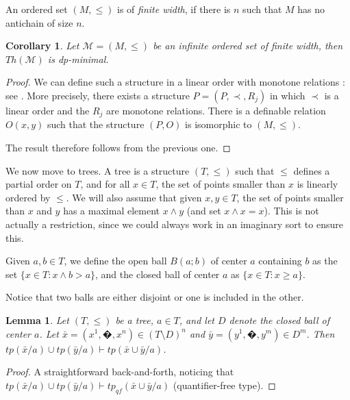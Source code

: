 \documentclass[english]{article}
\newtheorem{cor}[thm]{Corollary}
\newtheorem{lemme}[thm]{Lemma}
\theoremstyle{definition}
\theoremstyle{mystyle}
\theoremstyle{remark}
\begin{document}
An ordered set $(M,\leq)$ is of \emph{finite width}, if there is $n$ such that $M$ has no antichain of size $n$.

\begin{cor}
Let $\mathcal M=(M,\leq)$ be an infinite ordered set of finite width, then $Th(\mathcal M)$ is dp-minimal.
\end{cor}
\begin{proof}
We can define such a structure in a linear order with monotone relations : see \cite{Shm}. More precisely, there exists a structure $P=(P,\prec,R_j)$ in which $\prec$ is a linear order and the $R_j$ are monotone relations. There is a definable relation $O(x,y)$ such that the structure $(P,O)$ is isomorphic to $(M,\leq)$.

The result therefore follows from the previous one.
\end{proof}

We now move to trees. A tree is a structure $(T,\leq)$ such that $\leq$ defines a partial order on $T$, and for all $x \in T$, the set of points smaller than $x$ is linearly ordered by $\leq$. We will also assume that given $x,y \in T$, the set of points smaller than $x$ and $y$ has a maximal element $x\wedge y$ (and set $x \wedge x = x$). This is not actually a restriction, since we could always work in an imaginary sort to ensure this.

Given $a,b \in T$, we define the open ball $B(a;b)$ of center $a$ containing $b$ as the set $\{x \in T : x\wedge b > a\}$, and the closed ball of center $a$ as $\{x \in T : x \geq a\}$.

Notice that two balls are either disjoint or one is included in the other.

\begin{lemme}\label{orth}
Let $(T,\leq)$ be a tree, $a \in T$, and let $D$ denote the closed ball of center $a$. Let $\bar x =(x^1,�,x ^n) \in (T\setminus D)^n$ and $\bar y=(y^1,�,y^m) \in D^m$. Then $tp(\bar x/a) \cup tp(\bar y/a)\vdash tp(\bar x \cup \bar y/a)$.
\end{lemme}
\begin{proof}
A straightforward back-and-forth, noticing that $tp(\bar x/a) \cup tp(\bar y/a)\vdash tp_{qf}(\bar x \cup \bar y/a)$ (quantifier-free type).
\end{proof}
\end{document}

